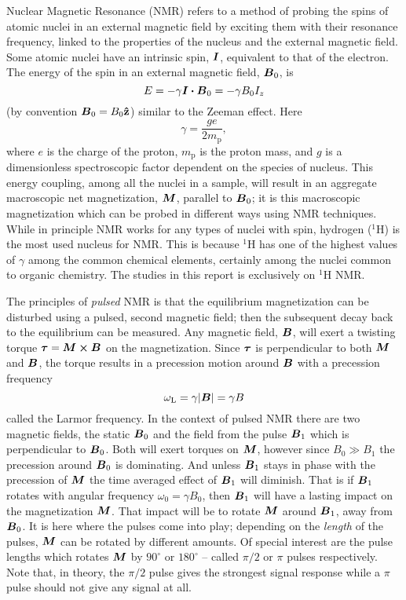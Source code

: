 \documentclass[11pt,a4paper, twocolumn,
swedish, english %
]{article}
\begin{document}
Nuclear Magnetic Resonance (NMR) refers to a method of probing the
spins of atomic nuclei in an external magnetic field by exciting
them with their resonance frequency, linked to the properties of the
nucleus and the external magnetic field. Some atomic nuclei have an
intrinsic spin, $\vb*I$, equivalent to that of the electron. The
energy of the spin in an external magnetic field, $\vb*B_0$, is
\begin{equation}\label{eq:mag-energy}
E=-\gamma\vb*I\vdot\vb*B_0=-\gamma B_0 I_z
\end{equation}
(by convention $\vb*B_0=B_0\vu{z}$) similar to the Zeeman effect. Here
\begin{equation}
\gamma=\frac{ge}{2m_\text{p}},
\end{equation}
where $e$ is the charge of the proton, $m_\text{p}$ is the proton
mass, and $g$ is a dimensionless spectroscopic factor dependent on the
species of nucleus. This energy coupling, among all the nuclei in a
sample, will result in an aggregate macroscopic net magnetization,
$\vb*M$, parallel to $\vb*B_0$; it is this macroscopic magnetization which
can be probed in different ways using NMR techniques. 
While in principle NMR works for any types of nuclei with spin,
hydrogen ($^1$H) is the most used nucleus for NMR. This is because
$^1$H has one of the highest values of $\gamma$ among the common
chemical elements, certainly among the nuclei common to organic
chemistry. The studies in this report is exclusively on $^1$H NMR.

The principles of \emph{pulsed} NMR is that the equilibrium
magnetization can be disturbed using a pulsed, second magnetic field;
then the subsequent decay back to the equilibrium can be
measured. Any magnetic field, $\vb*B$, will exert a twisting torque
$\vb*\tau=\vb*M\cross\vb*B$ on the magnetization. Since $\vb*\tau$ is
perpendicular to both $\vb*M$ and $\vb*B$, the torque results in a
precession motion around $\vb*B$ with a precession frequency
\cite[ch. 2.1]{Principles_MR1990} 
\begin{equation}
\omega_\text{L} = \gamma \abs{\vb*B}= \gamma B
\end{equation}
called the Larmor frequency. 
In the context of pulsed NMR there are two magnetic fields, the static
$\vb*B_0$ and the field from the pulse $\vb*B_1$ which is
perpendicular to $\vb*B_0$. Both will exert torques on $\vb*M$,
however since $B_0\gg B_1$ the precession around $\vb*B_0$ is
dominating. And unless $\vb*B_1$ stays in phase with the precession of
$\vb*M$ the time averaged effect of $\vb*B_1$ will diminish. That is
if $\vb*B_1$ rotates\footnotemark{} with angular frequency
$\omega_0=\gamma B_0$, then $\vb*B_1$ will have a lasting impact on
the magnetization $\vb*M$. That impact will be to rotate $\vb*M$
around $\vb*B_1$, away from $\vb*B_0$. It is here where the pulses
come into play; depending on the \emph{length} of the pulses, $\vb*M$
can be rotated by different amounts. Of special interest are the pulse
lengths which rotates $\vb*M$ by $90^\circ$ or $180^\circ$ -- called
$\pi/2$ or $\pi$ pulses respectively. Note that, in theory, the
$\pi/2$ pulse gives the strongest signal response while a $\pi$ pulse
should not give any signal at all.
\end{document}
